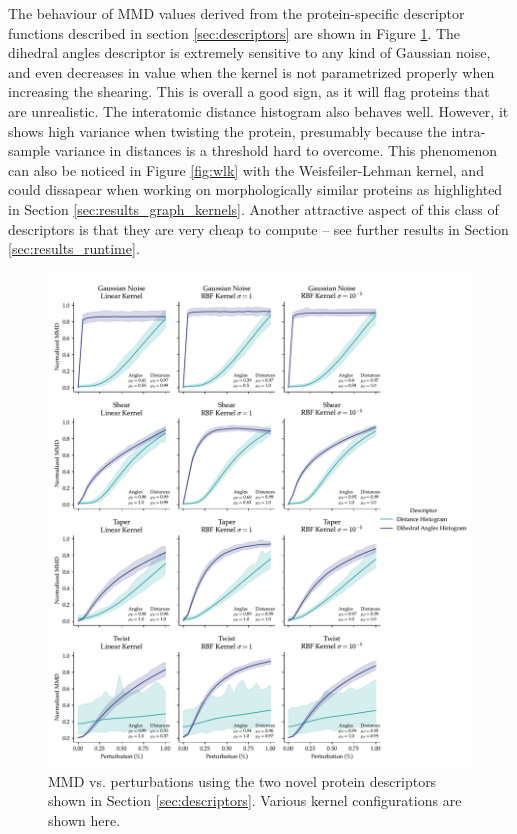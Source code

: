 The behaviour of MMD values derived from the protein-specific descriptor
functions described in section \ref{sec:descriptors} are shown in Figure
\ref{fig:protein_specific_descriptors}. The dihedral angles descriptor is
extremely sensitive to any kind of Gaussian noise, and even decreases in value
when the kernel is not parametrized properly when increasing the shearing. This
is overall a good sign, as it will flag proteins that are unrealistic. The
interatomic distance histogram also behaves well. However, it shows high
variance when twisting the protein, presumably because the intra-sample variance
in distances is a threshold hard to overcome. This phenomenon can also be
noticed in Figure \ref{fig:wlk} with the Weisfeiler-Lehman kernel, and could
dissapear when working on morphologically similar proteins as highlighted in
Section \ref{sec:results_graph_kernels}. Another attractive aspect of this class
of descriptors is that they are very cheap to compute -- see further results in
Section \ref{sec:results_runtime}.

\begin{figure}
  \includegraphics[width=\textwidth]{./figures/results/res_4.pdf}
  \caption[MMD vs. perturbations using the two novel protein descriptors.]{MMD vs. perturbations using the two novel protein descriptors shown
    in Section \ref{sec:descriptors}. Various kernel configurations are shown
    here.}
  \label{fig:protein_specific_descriptors}
\end{figure}

